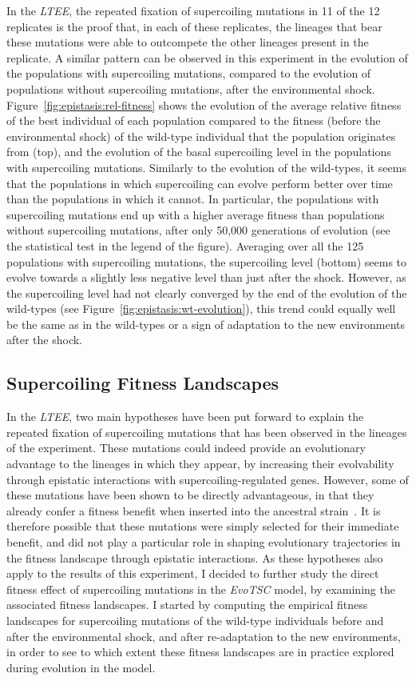 In the \emph{LTEE}, the repeated fixation of supercoiling mutations in 11 of the 12 replicates is the proof that, in each of these replicates, the lineages that bear these mutations were able to outcompete the other lineages present in the replicate.
A similar pattern can be observed in this experiment in the evolution of the populations with supercoiling mutations, compared to the evolution of populations without supercoiling mutations, after the environmental shock.
Figure~\ref{fig:epistasis:rel-fitness} shows the evolution of the average relative fitness of the best individual of each population compared to the fitness (before the environmental shock) of the wild-type individual that the population originates from (top), and the evolution of the basal supercoiling level in the populations with supercoiling mutations.
Similarly to the evolution of the wild-types, it seems that the populations in which supercoiling can evolve perform better over time than the populations in which it cannot.
In particular, the populations with supercoiling mutations end up with a higher average fitness than populations without supercoiling mutations, after only 50,000 generations of evolution (see the statistical test in the legend of the figure).
Averaging over all the 125 populations with supercoiling mutations, the supercoiling level (bottom) seems to evolve towards a slightly less negative level than just after the shock.
However, as the supercoiling level had not clearly converged by the end of the evolution of the wild-types (see Figure~\ref{fig:epistasis:wt-evolution}), this trend could equally well be the same as in the wild-types or a sign of adaptation to the new environments after the shock.

\subsection{Supercoiling Fitness Landscapes}

In the \emph{LTEE}, two main hypotheses have been put forward to explain the repeated fixation of supercoiling mutations that has been observed in the lineages of the experiment.
These mutations could indeed provide an evolutionary advantage to the lineages in which they appear, by increasing their evolvability through epistatic interactions with supercoiling-regulated genes.
However, some of these mutations have been shown to be directly advantageous, in that they already confer a fitness benefit when inserted into the ancestral strain~\citep{crozat2005}.
It is therefore possible that these mutations were simply selected for their immediate benefit, and did not play a particular role in shaping evolutionary trajectories in the fitness landscape through epistatic interactions.
As these hypotheses also apply to the results of this experiment, I decided to further study the direct fitness effect of supercoiling mutations in the \emph{EvoTSC} model, by examining the associated fitness landscapes.
I started by computing the empirical fitness landscapes for supercoiling mutations of the wild-type individuals before and after the environmental shock, and after re-adaptation to the new environments, in order to see to which extent these fitness landscapes are in practice explored during evolution in the model.

